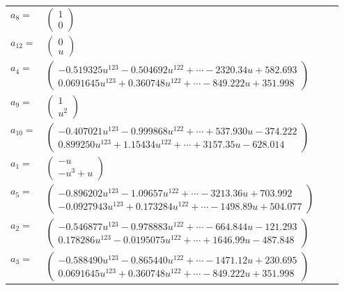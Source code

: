 \documentclass[1p]{elsarticle_modified}
\theoremstyle{definition}
\begin{document}
\begin{tabular}{m{7pt} m{180pt} m{7pt} m{180pt} }
\flushright $a_{8}=$&$\begin{pmatrix}1\\0\end{pmatrix}$ \\
\flushright $a_{12}=$&$\begin{pmatrix}0\\u\end{pmatrix}$ \\
\flushright $a_{4}=$&$\begin{pmatrix}-0.519325 u^{123}-0.504692 u^{122}+\cdots-2320.34 u+582.693\\0.0691645 u^{123}+0.360748 u^{122}+\cdots-849.222 u+351.998\end{pmatrix}$ \\
\flushright $a_{9}=$&$\begin{pmatrix}1\\u^2\end{pmatrix}$ \\
\flushright $a_{10}=$&$\begin{pmatrix}-0.407021 u^{123}-0.999868 u^{122}+\cdots+537.930 u-374.222\\0.899250 u^{123}+1.15434 u^{122}+\cdots+3157.35 u-628.014\end{pmatrix}$ \\
\flushright $a_{1}=$&$\begin{pmatrix}- u\\- u^3+u\end{pmatrix}$ \\
\flushright $a_{5}=$&$\begin{pmatrix}-0.896202 u^{123}-1.09657 u^{122}+\cdots-3213.36 u+703.992\\-0.0927943 u^{123}+0.173284 u^{122}+\cdots-1498.89 u+504.077\end{pmatrix}$ \\
\flushright $a_{2}=$&$\begin{pmatrix}-0.546877 u^{123}-0.978883 u^{122}+\cdots-664.844 u-121.293\\0.178286 u^{123}-0.0195075 u^{122}+\cdots+1646.99 u-487.848\end{pmatrix}$ \\
\flushright $a_{3}=$&$\begin{pmatrix}-0.588490 u^{123}-0.865440 u^{122}+\cdots-1471.12 u+230.695\\0.0691645 u^{123}+0.360748 u^{122}+\cdots-849.222 u+351.998\end{pmatrix}$ \\

\end{tabular}
\end{document}
